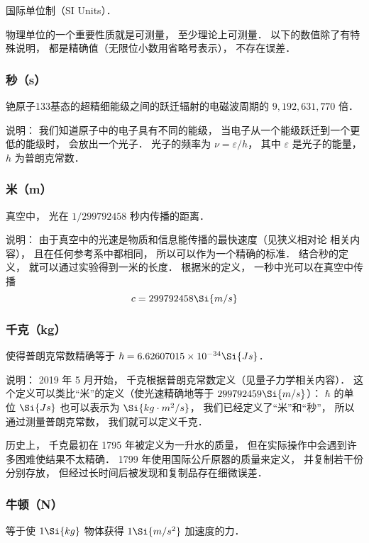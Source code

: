 

国际单位制（SI Units）．

物理单位的一个重要性质就是可测量， 至少理论上可测量． 以下的数值除了有特殊说明， 都是精确值（无限位小数用省略号表示）， 不存在误差．

\subsubsection{秒（s）}
铯原子133基态的超精细能级之间的跃迁辐射的电磁波周期的 $9, 192, 631, 770$ 倍． 

说明： 我们知道原子中的电子具有不同的能级， 当电子从一个能级跃迁到一个更低的能级时， 会放出一个光子． 光子的频率为 $\nu  = \varepsilon /h$，   其中 $\varepsilon $ 是光子的能量， $h$ 为普朗克常数．

\subsubsection{米（m）}
真空中， 光在 $1/299792458$ 秒内传播的距离．

说明： 由于真空中的光速是物质和信息能传播的最快速度（见狭义相对论 相关内容）， 且在任何参考系中都相同， 所以可以作为一个精确的标准． 结合秒的定义， 就可以通过实验得到一米的长度． 根据米的定义， 一秒中光可以在真空中传播
\begin{equation}
c = 299792458 \Si{m/s}
\end{equation}

\subsubsection{千克（kg）}
使得普朗克常数精确等于 $\hbar = 6.62607015\times10^{-34}\Si{Js}$．

说明： 2019 年 5 月开始， 千克根据普朗克常数定义（见量子力学相关内容）． 这个定义可以类比“米”的定义（使光速精确地等于 $299792459\Si{m/s}$）： $\hbar$ 的单位 $\Si{Js}$ 也可以表示为 $\Si{kg\cdot m^2/s}$， 我们已经定义了“米”和“秒”， 所以通过测量普朗克常数， 我们就可以定义千克．

历史上， 千克最初在 1795 年被定义为一升水的质量， 但在实际操作中会遇到许多困难使结果不太精确． 1799 年使用国际公斤原器的质量来定义， 并复制若干份分别存放， 但经过长时间后被发现和复制品存在细微误差．

\subsubsection{牛顿（N）}
等于使 $1\Si{kg}$ 物体获得 $1\Si{m/s^2}$ 加速度的力．

